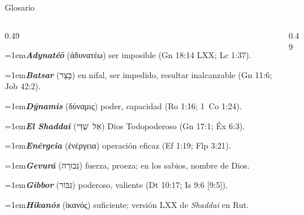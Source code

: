 \documentclass[hyperref={bookmarks=false},aspectratio=169]{beamer}
\newcommand{\heb}[1]{\mbox{\foreignlanguage{hebrew}{#1}}}
\newcommand{\grc}[1]{\foreignlanguage{ancientgreek}{#1}}
\begin{document}
\begin{frame}{Glosario}
\scriptsize\RaggedRight
\begin{columns}[t,onlytextwidth]
\begin{column}{0.49\textwidth}

\par\noindent\hangindent=1em{\color{azul}\textbf{\emph{Adynatéō}}} (\grc{ἀδυνατέω}) ser imposible (Gn 18:14 LXX; Lc 1:37).\par\vspace{2pt}
\par\noindent\hangindent=1em{\color{azul}\textbf{\emph{Batsar}}} (\heb{בָּצַר}) en nifal, ser impedido, resultar inalcanzable (Gn 11:6; Job 42:2).\par\vspace{2pt}
\par\noindent\hangindent=1em{\color{azul}\textbf{\emph{Dýnamis}}} (\grc{δύναμις}) poder, capacidad (Ro 1:16; 1~Co 1:24).\par\vspace{2pt}
\par\noindent\hangindent=1em{\color{azul}\textbf{\emph{El Shaddai}}} (\heb{אֵל שַׁדַּי}) Dios Todopoderoso (Gn 17:1; Éx 6:3).\par\vspace{2pt}
\par\noindent\hangindent=1em{\color{azul}\textbf{\emph{Enérgeia}}} (\grc{ἐνέργεια}) operación eficaz (Ef 1:19; Flp 3:21).\par\vspace{2pt}
\par\noindent\hangindent=1em{\color{azul}\textbf{\emph{Gevurá}}} (\heb{גְּבוּרָה}) fuerza, proeza; en los sabios, nombre de Dios.\par\vspace{2pt}
\par\noindent\hangindent=1em{\color{azul}\textbf{\emph{Gibbor}}} (\heb{גִּבּוֹר}) poderoso, valiente (Dt 10:17; Is 9:6 [9:5]).\par\vspace{2pt}
\par\noindent\hangindent=1em{\color{azul}\textbf{\emph{Hikanós}}} (\grc{ἱκανός}) suficiente; versión LXX de \emph{Shaddai} en Rut.\par\vspace{2pt}

\end{column}
\begin{column}{0.49\textwidth}


\end{column}
\end{columns}
\end{frame}
\end{document}
